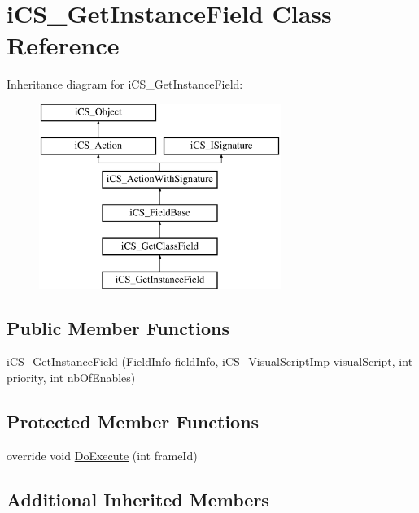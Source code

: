 \hypertarget{classi_c_s___get_instance_field}{\section{i\+C\+S\+\_\+\+Get\+Instance\+Field Class Reference}
\label{classi_c_s___get_instance_field}
}
Inheritance diagram for i\+C\+S\+\_\+\+Get\+Instance\+Field\+:\begin{figure}[H]
\begin{center}
\leavevmode
\includegraphics[height=6.000000cm]{classi_c_s___get_instance_field}
\end{center}
\end{figure}
\subsection*{Public Member Functions}
\begin{DoxyCompactItemize}
\item 
\hyperlink{classi_c_s___get_instance_field_ac933bb6cba011c2f6bc9ba3f03612091}{i\+C\+S\+\_\+\+Get\+Instance\+Field} (Field\+Info field\+Info, \hyperlink{classi_c_s___visual_script_imp}{i\+C\+S\+\_\+\+Visual\+Script\+Imp} visual\+Script, int priority, int nb\+Of\+Enables)
\end{DoxyCompactItemize}
\subsection*{Protected Member Functions}
\begin{DoxyCompactItemize}
\item 
override void \hyperlink{classi_c_s___get_instance_field_a8998b4537ec1f560782d92a0fc7e2419}{Do\+Execute} (int frame\+Id)
\end{DoxyCompactItemize}
\subsection*{Additional Inherited Members}



